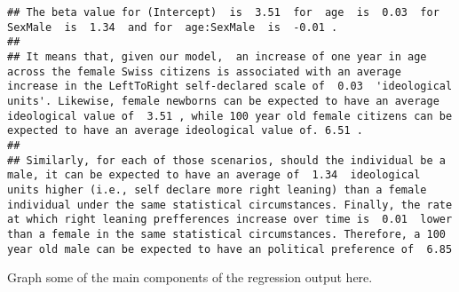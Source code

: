 \documentclass[
]{book}
\newenvironment{Shaded}{\begin{snugshade}}{\end{snugshade}}
\begin{document}
\begin{Shaded}
\begin{Highlighting}[]
\end{Highlighting}
\end{Shaded}

\begin{verbatim}
## The beta value for (Intercept)  is  3.51  for  age  is  0.03  for  SexMale  is  1.34  and for  age:SexMale  is  -0.01 . 
## 
## It means that, given our model,  an increase of one year in age across the female Swiss citizens is associated with an average increase in the LeftToRight self-declared scale of  0.03  'ideological units'. Likewise, female newborns can be expected to have an average ideological value of  3.51 , while 100 year old female citizens can be expected to have an average ideological value of. 6.51 . 
## 
## Similarly, for each of those scenarios, should the individual be a male, it can be expected to have an average of  1.34  ideological units higher (i.e., self declare more right leaning) than a female individual under the same statistical circumstances. Finally, the rate at which right leaning prefferences increase over time is  0.01  lower than a female in the same statistical circumstances. Therefore, a 100 year old male can be expected to have an political preference of  6.85
\end{verbatim}

Graph some of the main components of the regression output here.
\end{document}
